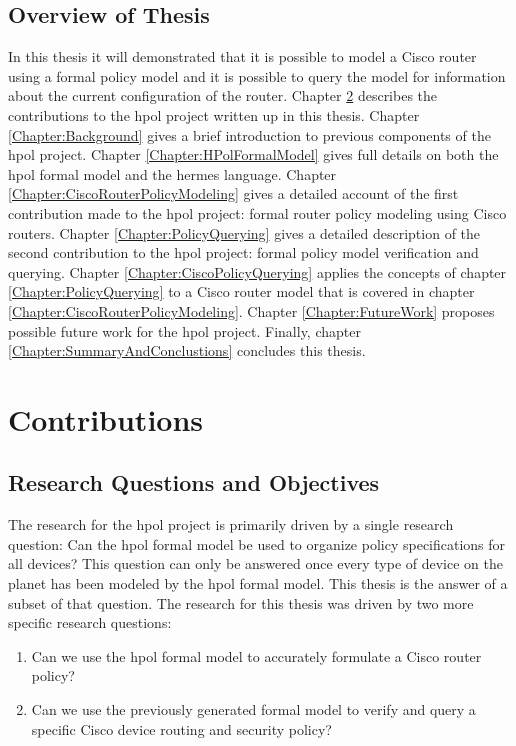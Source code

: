 \documentclass[12pt,letterpaper]{report}
\begin{document}
\section{Overview of Thesis}

In this thesis it will demonstrated that it is possible to model a Cisco router using a formal policy model and it is possible to query the model for information about the current configuration of the router. Chapter \ref{Chapter:Contributions} describes the contributions to the \ac{hpol} project written up in this thesis. Chapter \ref{Chapter:Background} gives a brief introduction to previous components of the \ac{hpol} project. Chapter \ref{Chapter:HPolFormalModel} gives full details on both the \ac{hpol} formal model and the \ac{hermes} language. Chapter \ref{Chapter:CiscoRouterPolicyModeling} gives a detailed account of the first contribution made to the \ac{hpol} project: formal router policy modeling using Cisco routers. Chapter \ref{Chapter:PolicyQuerying} gives a detailed description of the second contribution to the \ac{hpol} project: formal policy model verification and querying. Chapter \ref{Chapter:CiscoPolicyQuerying} applies the concepts of chapter \ref{Chapter:PolicyQuerying} to a Cisco router model that is covered in chapter \ref{Chapter:CiscoRouterPolicyModeling}. Chapter \ref{Chapter:FutureWork} proposes possible future work for the \ac{hpol} project. Finally, chapter \ref{Chapter:SummaryAndConclustions} concludes this thesis. 

\chapter{Contributions}
\label{Chapter:Contributions}
\section{Research Questions and Objectives}
The research for the \ac{hpol} project is primarily driven by a single research question: Can the \ac{hpol} formal model be used to organize policy specifications for all devices? This question can only be answered once every type of device on the planet has been modeled by the \ac{hpol} formal model. This thesis is the answer of a subset of that question. The research for this thesis was driven by two more specific research questions:

\begin{enumerate}
	\item Can we use the \ac{hpol} formal model to accurately formulate a Cisco router policy?
	\item Can we use the previously generated formal model to verify and query a specific Cisco device routing and security policy?
\end{enumerate}
\end{document}
